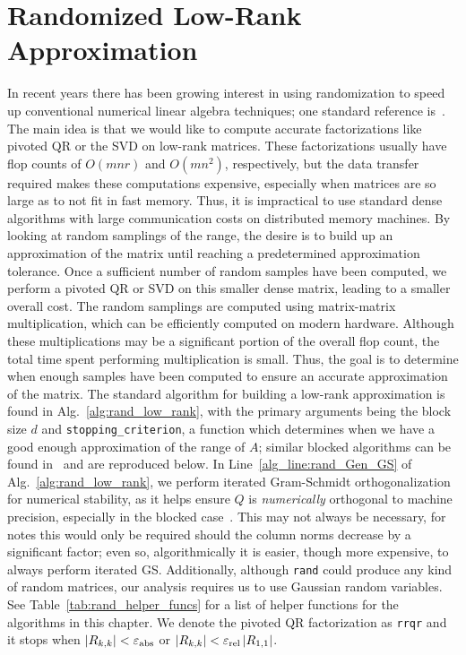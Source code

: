 \section{Randomized Low-Rank Approximation}
\label{sec:rand_lra}

In recent years there has been growing interest in using randomization
to speed up conventional numerical linear algebra techniques;
one standard reference is~\cite{RandomReview2011}.
The main idea is that we would like to compute
accurate factorizations like pivoted QR or the SVD on low-rank matrices.
These factorizations usually have  flop counts of
$O(mnr)$ and $O(mn^{2})$, respectively,
but the data transfer required makes these computations expensive,
especially when matrices are so large as to not fit in fast memory.
Thus, it is impractical to use standard dense algorithms with
large communication costs on distributed memory machines.
By looking at random samplings of the range, the desire is
to build up an approximation of the matrix until reaching
a predetermined approximation tolerance.
Once a sufficient number of random samples have been computed,
we perform a pivoted QR or SVD on this smaller dense
matrix, leading to a smaller overall cost.
The random samplings are computed using matrix-matrix multiplication,
which can be efficiently computed on modern hardware.
Although these multiplications may be a significant portion
of the overall flop count, the total time
spent performing multiplication is small.
Thus, the goal is to determine when enough samples have been computed
to ensure an accurate approximation of the matrix.
The standard algorithm for building a low-rank approximation
is found in Alg.~\ref{alg:rand_low_rank}, with the primary
arguments being the block size $d$ and \texttt{stopping\_criterion},
a function which determines when we have a good enough approximation
of the range of $A$; similar blocked algorithms can be found
in~\cite{yu2018efficient,martinsson2016randomized} and are reproduced below.
In Line~\ref{alg_line:rand_Gen_GS} of Alg.~\ref{alg:rand_low_rank},
we perform iterated Gram-Schmidt orthogonalization for numerical stability,
as it helps ensure $Q$ is \emph{numerically} orthogonal to machine
precision, especially in the blocked case~\cite{bjorck1994GS,stewart2008}.
This may not always be necessary, for \cite{stewart2008} notes
this would only be required should the column norms decrease by a significant
factor; even so, algorithmically it is easier, though more expensive,
to always perform iterated GS.
Additionally, although \texttt{rand} could produce any kind of random
matrices, our analysis requires us to use Gaussian random variables.
See Table~\ref{tab:rand_helper_funcs} for a list of helper functions
for the algorithms in this chapter.
We denote the pivoted QR factorization as \texttt{rrqr}
and it stops when $\left| R_{k,k} \right|<\varepsilon_{\text{abs}}$ or
$\left| R_{k,k} \right| < \varepsilon_{\text{rel}}\left| R_{1,1} \right|$.

